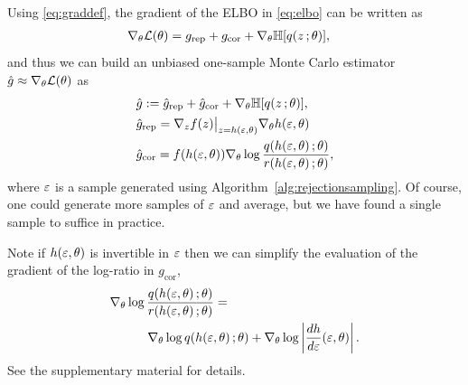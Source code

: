 Using \eqref{eq:graddef}, the gradient of the \gls{ELBO} in \eqref{eq:elbo} can be written as
\begin{align}
\begin{split}
&\nabla_\theta \mathcal{L}(\theta)  = g_{\text{rep}}+ g_{\text{cor}}+\nabla_\theta \mathbb{H}[q(z\, ;\theta)],
\end{split}
\label{eq:reparamgrad}
\end{align}
and thus we can build an unbiased one-sample Monte Carlo estimator $\hat g \approx \nabla_\theta \mathcal{L}(\theta)$ as
\begin{align}
\begin{split}
&\hat g  := \hat g_{\text{rep}} + \hat g_{\text{cor}}+\nabla_\theta \mathbb{H}[q(z\, ;\theta)], \\
& \hat g_{\text{rep}} = \nabla_z f(z)\big|_{z=h(\varepsilon,\theta)} \nabla_\theta h(\varepsilon,\theta) \\
& \hat g_{\text{cor}} = f(h(\varepsilon,\theta)) \nabla_\theta  \log \frac{q(h(\varepsilon,\theta)\, ; \theta)}{r(h(\varepsilon,\theta)\, ; \theta)},
\end{split}
\label{eq:reparamgrad2}
\end{align}
where $\varepsilon$ is a sample generated using Algorithm~\ref{alg:rejectionsampling}. Of course, one could generate more samples of $\varepsilon$ and average, but we have found a single sample to suffice in practice.



Note if $h(\varepsilon,\theta)$ is invertible in $\varepsilon$ then we can simplify the evaluation of the gradient of the log-ratio in $g_{\text{cor}}$,
\begin{align}
&\nabla_\theta  \log \frac{q(h(\varepsilon,\theta)\, ; \theta)}{r(h(\varepsilon,\theta)\, ; \theta)}  = \nonumber\\
&\quad\quad\quad\nabla_\theta  \log q(h(\varepsilon,\theta)\, ; \theta) + \nabla_\theta \log \left| \frac{d h}{d\varepsilon}(\varepsilon,\theta) \right| .\label{eq:gradQRcorr}
\end{align}
See the supplementary material for details.

